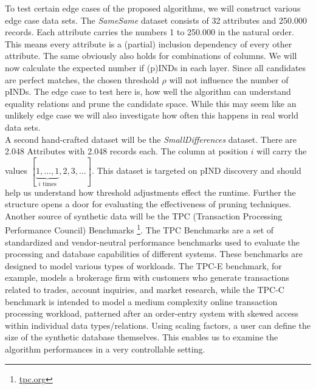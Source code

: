 \noindent To test certain edge cases of the proposed algorithms, we will construct various edge case data sets. The \textit{SameSame} dataset consists of 32 attributes and 250.000 records. Each attribute carries the numbers 1 to 250.000 in the natural order. This means every attribute is a (partial) inclusion dependency of every other attribute. The same obviously also holds for combinations of columns. We will now calculate the expected number if (p)INDs in each layer. Since all candidates are perfect matches, the chosen threshold $\rho$ will not influence the number of pINDs. The edge case to test here is, how well the algorithm can understand equality relations and prune the candidate space. While this may seem like an unlikely edge case we will also investigate how often this happens in real world data sets. \\

\noindent A second hand-crafted dataset will be the \textit{SmallDifferences} dataset. There are 2.048 Attributes with 2.048 records each. The column at position $i$ will carry the values $[\underbrace{1, \dots, 1}_{i\text{ times}}, 2, 3, \dots]$. This dataset is targeted on pIND discovery and should help us understand how threshold adjustments effect the runtime. Further the structure opens a door for evaluating the effectiveness of pruning techniques.\\

\noindent Another source of synthetic data will be the TPC (Transaction Processing Performance Council) Benchmarks \footnote{\href{https://www.tpc.org/}{tpc.org}}. The TPC Benchmarks are a set of standardized and vendor-neutral performance benchmarks used to evaluate the processing and database capabilities of different systems. These benchmarks are designed to model various types of workloads. The TPC-E benchmark, for example, models a brokerage firm with customers who generate transactions related to trades, account inquiries, and market research, while the TPC-C benchmark is intended to model a medium complexity online transaction processing workload, patterned after an order-entry system with skewed access within individual data types/relations. Using scaling factors, a user can define the size of the synthetic database themselves. This enables us to examine the algorithm performances in a very controllable setting.

